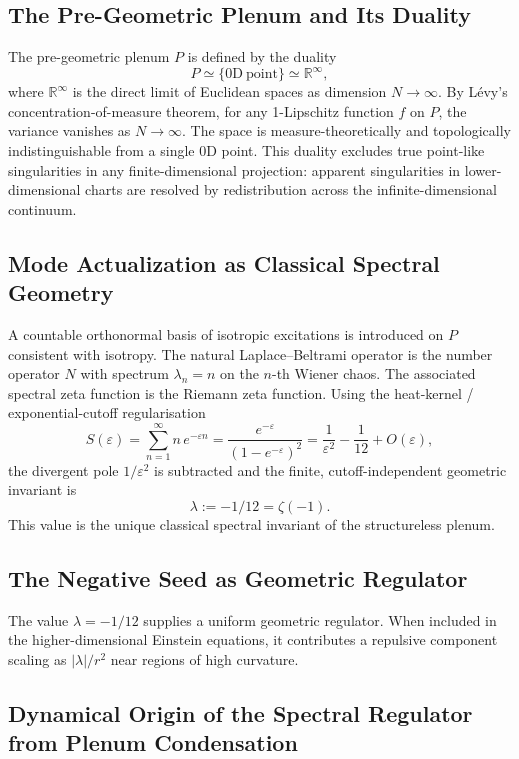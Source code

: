 \documentclass[11pt,a4paper,oneside]{article}
\begin{document}
\subsection{The Pre-Geometric Plenum and Its Duality}
The pre-geometric plenum $P$ is defined by the duality
\[
P \simeq \{0\mathrm{D\ point}\} \simeq \mathbb{R}^\infty,
\]
where $\mathbb{R}^\infty$ is the direct limit of Euclidean spaces as dimension $N\to\infty$. By Lévy’s concentration-of-measure theorem, for any 1-Lipschitz function $f$ on $P$, the variance vanishes as $N\to\infty$. The space is measure-theoretically and topologically indistinguishable from a single 0D point. This duality excludes true point-like singularities in any finite-dimensional projection: apparent singularities in lower-dimensional charts are resolved by redistribution across the infinite-dimensional continuum.

\subsection{Mode Actualization as Classical Spectral Geometry}
A countable orthonormal basis of isotropic excitations is introduced on $P$ consistent with isotropy. The natural Laplace–Beltrami operator is the number operator $N$ with spectrum $\lambda_n = n$ on the $n$-th Wiener chaos. The associated spectral zeta function is the Riemann zeta function. Using the heat-kernel / exponential-cutoff regularisation
\[
S(\varepsilon) = \sum_{n=1}^\infty n\, e^{-\varepsilon n} = \frac{e^{-\varepsilon}}{(1-e^{-\varepsilon})^2} = \frac{1}{\varepsilon^2} - \frac{1}{12} + O(\varepsilon),
\]
the divergent pole $1/\varepsilon^2$ is subtracted and the finite, cutoff-independent geometric invariant is
\[
\lambda := -1/12 = \zeta(-1).
\]
This value is the unique classical spectral invariant of the structureless plenum.

\subsection{The Negative Seed as Geometric Regulator}
The value $\lambda = -1/12$ supplies a uniform geometric regulator. When included in the higher-dimensional Einstein equations, it contributes a repulsive component scaling as $|\lambda|/r^2$ near regions of high curvature.

\subsection{Dynamical Origin of the Spectral Regulator from Plenum Condensation}
\end{document}
